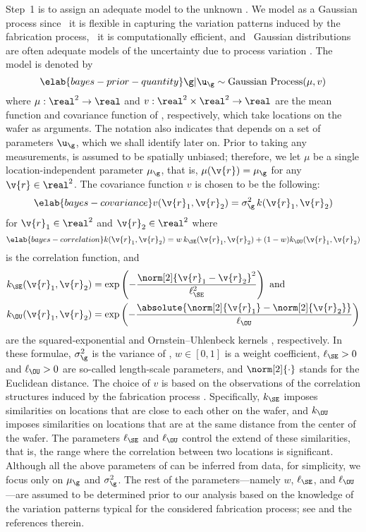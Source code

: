 Step~1 is to assign an adequate model to the unknown \g. We model \g as a
Gaussian process \cite{rasmussen2006} since \one~it is flexible in capturing the
variation patterns induced by the fabrication process, \two~it is
computationally efficient, and \three~Gaussian distributions are often adequate
models of the uncertainty due to process variation \cite{reda2009,
srivastava2010, juan2012}. The model is denoted by
\begin{equation} \elab{bayes-prior-quantity}
  \g | \u_\g \sim \mathrm{Gaussian\ Process}(\mu, v)
\end{equation}
where $\mu: \real^2 \to \real$ and $v: \real^2 \times \real^2 \to \real$ are the
mean function and covariance function of \g, respectively, which take locations
on the wafer as arguments. The notation also indicates that \g depends on a set
of parameters $\u_\g$, which we shall identify later on. Prior to taking any
measurements, \g is assumed to be spatially unbiased; therefore, we let $\mu$ be
a single location-independent parameter $\mu_\g$, that is, $\mu(\v{r}) = \mu_\g$
for any $\v{r} \in \real^2$. The covariance function $v$ is chosen to be the
following:
\begin{equation} \elab{bayes-covariance}
  v(\v{r}_1, \v{r}_2) = \sigma_\g^2 \, k(\v{r}_1, \v{r}_2)
\end{equation}
for $\v{r}_1 \in \real^2$ and $\v{r}_2 \in \real^2$ where
\begin{equation} \elab{bayes-correlation}
  k(\v{r}_1, \v{r}_2) = w \, k_\SE(\v{r}_1, \v{r}_2) + (1 - w) k_\OU(\v{r}_1, \v{r}_2)
\end{equation}
is the correlation function, and
\begin{align*}
  k_\SE(\v{r}_1, \v{r}_2) & = \exp\left(-\frac{\norm[2]{\v{r}_1 - \v{r}_2}^2}{\ell_\SE^2}\right) \text{ and} \\
  k_\OU(\v{r}_1, \v{r}_2) & = \exp\left(-\frac{\absolute{\norm[2]{\v{r}_1} - \norm[2]{\v{r}_2}}}{\ell_\OU}\right)
\end{align*}
are the squared-exponential and Ornstein--Uhlenbeck kernels
\cite{rasmussen2006}, respectively. In these formulae, $\sigma_\g^2$ is the
variance of \g, $w \in [0, 1]$ is a weight coefficient, $\ell_\SE > 0$ and
$\ell_\OU > 0$ are so-called length-scale parameters, and $\norm[2]{\cdot}$
stands for the Euclidean distance. The choice of $v$ is based on the
observations of the correlation structures induced by the fabrication process
\cite{chandrakasan2000, cheng2011}. Specifically, $k_\SE$ imposes similarities
on locations that are close to each other on the wafer, and $k_\OU$ imposes
similarities on locations that are at the same distance from the center of the
wafer. The parameters $\ell_\SE$ and $\ell_\OU$ control the extend of these
similarities, that is, the range where the correlation between two locations is
significant. Although all the above parameters of \g can be inferred from data,
for simplicity, we focus only on $\mu_\g$ and $\sigma_\g^2$. The rest of the
parameters---namely $w$, $\ell_\SE$, and $\ell_\OU$---are assumed to be
determined prior to our analysis based on the knowledge of the variation
patterns typical for the considered fabrication process; see \cite{marzouk2009}
and the references therein.


